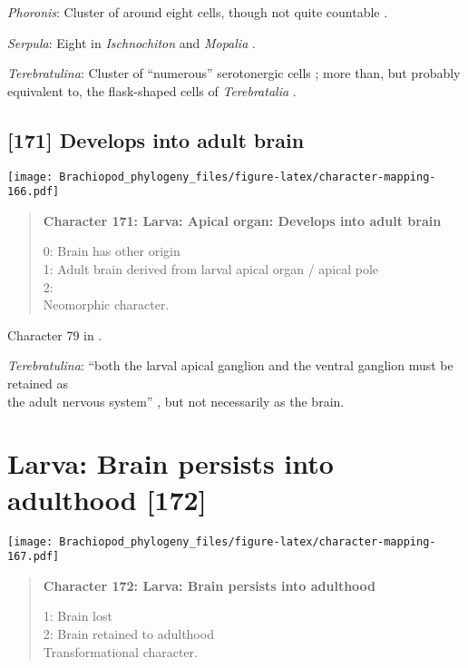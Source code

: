 \documentclass[openany]{book}
\theoremstyle{definition}
\theoremstyle{definition}
\theoremstyle{definition}
\theoremstyle{remark}
\begin{document}
\hypertarget{Phoronis-coding-170}{}
\emph{Phoronis}: Cluster of around eight cells, though not quite
countable \citep{Wanninger2005}.

\hypertarget{Serpula-coding-170}{}
\emph{Serpula}: Eight in \emph{Ischnochiton} and \emph{Mopalia}
\citep{Wanninger2007}.

\hypertarget{Terebratulina-coding-170}{}
\emph{Terebratulina}: Cluster of ``numerous'' serotonergic cells
\citep{HaySchmidt1992, Altenburger2010}; more than, but probably
equivalent to, the flask-shaped cells of \emph{Terebratalia}
\citep{Luter2016}.

\subsection*{{[}171{]} Develops into adult
brain}\label{develops-into-adult-brain}

\texttt{[image: Brachiopod\_phylogeny\_files/figure-latex/character-mapping-166.pdf]}

\begin{quote}
\textbf{Character 171: Larva: Apical organ: Develops into adult brain}

0: Brain has other origin\\
1: Adult brain derived from larval apical organ / apical pole\\
2:\\
Neomorphic character.
\end{quote}

Character 79 in \citet{Glenner2004}.

\hypertarget{Terebratulina-coding-171}{}
\emph{Terebratulina}: ``both the larval apical ganglion and the ventral
ganglion must be retained as\\
the adult nervous system'' \citep{HaySchmidt1992}, but not necessarily
as the brain.

\section{Larva: Brain persists into adulthood
{[}172{]}}\label{larva-brain-persists-into-adulthood-172}

\texttt{[image: Brachiopod\_phylogeny\_files/figure-latex/character-mapping-167.pdf]}

\begin{quote}
\textbf{Character 172: Larva: Brain persists into adulthood}

1: Brain lost\\
2: Brain retained to adulthood\\
Transformational character.
\end{quote}
\end{document}
